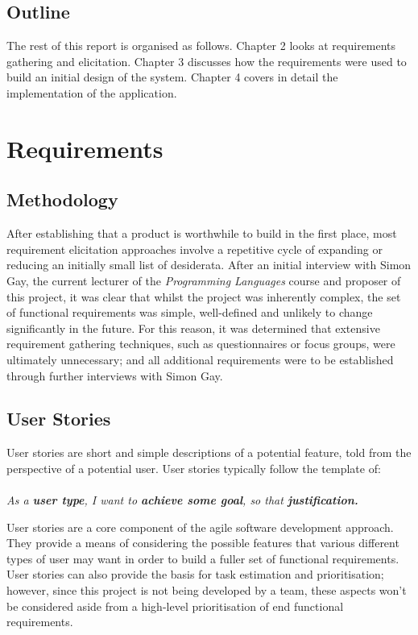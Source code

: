 \documentclass{l4proj}
\begin{document}
\section{Outline}
The rest of this report is organised as follows. Chapter 2 looks at requirements gathering and elicitation. Chapter 3 discusses how the requirements were used to build an initial design of the system. Chapter 4 covers in detail the implementation of the application.

\chapter{Requirements}
\section{Methodology} 
After establishing that a product is worthwhile to build in the first place, most requirement elicitation approaches involve a repetitive cycle of expanding or reducing an initially small list of desiderata. After an initial interview with Simon Gay, the current lecturer of the {\it Programming Languages} course and proposer of this project, it was clear that whilst the project was inherently complex, the set of functional requirements was simple, well-defined and unlikely to change significantly in the future. For this reason, it was determined that extensive requirement gathering techniques, such as questionnaires or focus groups, were ultimately unnecessary; and all additional requirements were to be established through further interviews with Simon Gay.

\section{User Stories}
User stories are short and simple descriptions of a potential feature, told from the perspective of a potential user. User stories typically follow the template of:\\\\
\textit{As a \textbf{user type}, I want to \textbf{achieve some goal}, so that \textbf{justification.}}

User stories are a core component of the agile software development approach. They provide a means of considering the possible features that various different types of user may want in order to build a fuller set of functional requirements. User stories can also provide the basis for task estimation and prioritisation; however, since this project is not being developed by a team, these aspects won't be considered aside from a high-level prioritisation of end functional requirements.
\end{document}
